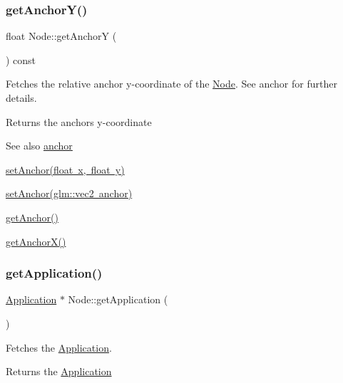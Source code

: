 \subsubsection{\texorpdfstring{getAnchorY()}{getAnchorY()}}
{\footnotesize\ttfamily float Node\+::get\+AnchorY (\begin{DoxyParamCaption}{ }\end{DoxyParamCaption}) const}



Fetches the relative anchor y-\/coordinate of the \mbox{\hyperlink{classsage_1_1Node}{Node}}. See anchor for further details. 

\begin{DoxyReturn}{Returns}
the anchor\textquotesingle{}s y-\/coordinate 
\end{DoxyReturn}
\begin{DoxySeeAlso}{See also}
\mbox{\hyperlink{classsage_1_1Node_a0956f07efec6dcbd3cf796a9028b9175}{anchor}} 

\mbox{\hyperlink{classsage_1_1Node_a8813a645a74f6ab59b25d434e65035c6}{set\+Anchor(float x, float y)}} 

\mbox{\hyperlink{classsage_1_1Node_a957a7e578660950b8518926239397ea0}{set\+Anchor(glm\+::vec2 anchor)}} 

\mbox{\hyperlink{classsage_1_1Node_a6733949b7b281d78a8bef8beafe1b630}{get\+Anchor()}} 

\mbox{\hyperlink{classsage_1_1Node_aa5f31c33d60b32b618d3beaf4e5c6c51}{get\+Anchor\+X()}} 
\end{DoxySeeAlso}
\mbox{\label{classsage_1_1Node_af0f8bb1150be77ccc56cf470f3058176}} 
\subsubsection{\texorpdfstring{getApplication()}{getApplication()}}
{\footnotesize\ttfamily \mbox{\hyperlink{classsage_1_1Application}{Application}} $\ast$ Node\+::get\+Application (\begin{DoxyParamCaption}{ }\end{DoxyParamCaption})\hspace{0.3cm}{\ttfamily [virtual]}}



Fetches the \mbox{\hyperlink{classsage_1_1Application}{Application}}. 

\begin{DoxyReturn}{Returns}
the \mbox{\hyperlink{classsage_1_1Application}{Application}} 
\end{DoxyReturn}


